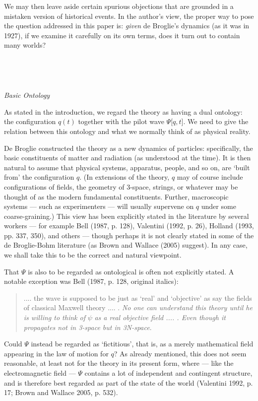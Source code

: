 \documentclass{article}%
\begin{document}
We may then leave aside certain spurious objections that are grounded in a
mistaken version of historical events. In the author's view, the proper way to
pose the question addressed in this paper is: \textit{given} de Broglie's
dynamics (as it was in 1927), if we examine it carefully on its own terms,
does it turn out to contain many worlds?

\ 

$\ $

\begin{center}
\textit{Basic Ontology}
\end{center}

As stated in the introduction, we regard the theory as having a dual ontology:
the configuration $q(t)$ together with the pilot wave $\Psi\lbrack q,t]$. We
need to give the relation between this ontology and what we normally think of
as physical reality.

De Broglie constructed the theory as a new dynamics of particles:
specifically, the basic constituents of matter and radiation (as understood at
the time). It is then natural to assume that physical systems, apparatus,
people, and so on, are `built from' the configuration $q$. (In extensions of
the theory, $q$ may of course include configurations of fields, the geometry
of 3-space, strings, or whatever may be thought of as the modern fundamental
constituents. Further, macroscopic systems --- such as experimenters --- will
usually supervene on $q$ under some coarse-graining.) This view has been
explicitly stated in the literature by several workers --- for example Bell
(1987, p. 128), Valentini (1992, p. 26), Holland (1993, pp. 337, 350), and
others --- though perhaps it is not clearly stated in some of the de
Broglie-Bohm literature (as Brown and Wallace (2005) suggest). In any case, we
shall take this to be the correct and natural viewpoint.

That $\Psi$ is also to be regarded as ontological is often not explicitly
stated. A notable exception was Bell (1987, p. 128, original italics):

\begin{quote}
.... the wave is supposed to be just as `real' and `objective' as say the
fields of classical Maxwell theory .... . \textit{No one can understand this
theory until he is willing to think of }$\psi$\textit{ as a real objective
field .... . Even though it propagates not in 3-space but in 3N-space}.
\end{quote}

Could $\Psi$ instead be regarded as `fictitious', that is, as a merely
mathematical field appearing in the law of motion for $q$? As already
mentioned, this does not seem reasonable, at least not for the theory in its
present form, where --- like the electromagnetic field --- $\Psi$ contains a
lot of independent and contingent structure, and is therefore best regarded as
part of the state of the world (Valentini 1992, p. 17; Brown and Wallace 2005,
p. 532).
\end{document}
